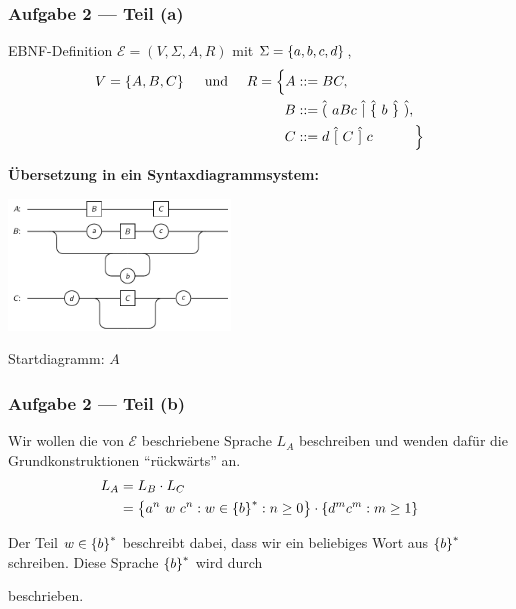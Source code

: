 \documentclass{beamer}
\begin{document}
\begin{frame} \frametitle{Aufgabe 2 --- Teil (a)}
	\small
	EBNF-Definition $\mathcal{E} = (V,\Sigma,A,R)$ mit $\Sigma = \left\{ a,b,c,d \right\}$,
	\begin{align*}
		V = \left\{ A,B,C \right\} 
		\quad \text{ und } \quad
		R = \Big\{ A &::= BC , \\ 
				   B &::= \hat{(} \ aBc \ \hat{|} \ \hat{\{} \ b \ \hat{\}} \ \hat{)} , \\
				   C &::= d \ \hat{[} \ C \ \hat{]} \ c 
		    \qquad\quad \Big\}
	\end{align*}

	\pause
	
	\textbf{Übersetzung in ein Syntaxdiagrammsystem:}
	
	\centering
	\includegraphics[height=3.5cm]{tut02_syntax-dia-2a.pdf}
	
	Startdiagramm: $A$
\end{frame}

\begin{frame} \frametitle{Aufgabe 2 --- Teil (b)}
	Wir wollen die von $\mathcal{E}$ beschriebene Sprache $L_A$ beschreiben und wenden dafür die Grundkonstruktionen \enquote{rückwärts} an. \pause
	\begin{align*}
		L_A &= L_B \cdot L_C \\
		&= \left\{  a^n \ w \ c^n : w \in \left\{ b \right\}^\ast : n \ge 0 \right\} \cdot \left\{ d^m c^m : m \ge 1 \right\}
	\end{align*}
	
	Der Teil $w \in \left\{ b \right\}^\ast$ beschreibt dabei, dass wir ein beliebiges Wort aus $\left\{ b \right\}^\ast$ schreiben. Diese Sprache $\left\{ b \right\}^\ast$ wird durch 
	\begin{center}
	\end{center}
	beschrieben.

\end{frame}
\end{document}
